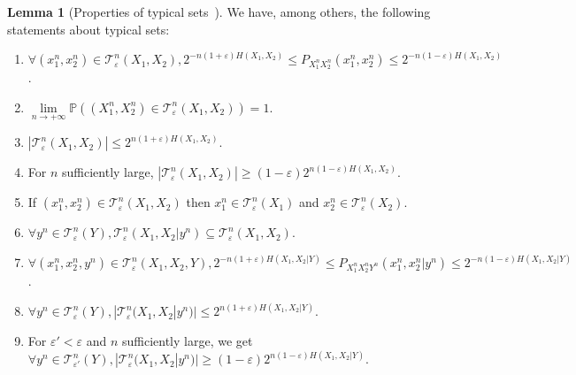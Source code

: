 \documentclass[11pt]{article}
\theoremstyle{definition}
\newtheorem{lem}[theo]{Lemma}
\theoremstyle{remark}
\begin{document}
      \begin{lem}[Properties of typical sets~\cite{GK11}]
        We have, among others, the following statements about typical sets:
        \begin{enumerate}
        \item $\forall (x_1^n,x_2^n) \in \mathcal{T}^n_{\varepsilon}(X_1,X_2), 2^{-n(1+\varepsilon)H(X_1,X_2)} \leq P_{X_1^nX_2^n}(x_1^n,x_2^n) \leq 2^{-n(1-\varepsilon)H(X_1,X_2)}$.
        \item $\underset{n \rightarrow +\infty}{\lim} \mathbb{P}\left((X_1^n,X_2^n) \in \mathcal{T}^n_{\varepsilon}(X_1,X_2) \right) = 1$.
        \item $|\mathcal{T}^n_{\varepsilon}(X_1,X_2)| \leq 2^{n(1+\varepsilon)H(X_1,X_2)}$.
        \item For $n$ sufficiently large, $|\mathcal{T}^n_{\varepsilon}(X_1,X_2)| \geq (1-\varepsilon)2^{n(1-\varepsilon)H(X_1,X_2)}$.
        \item If $(x_1^n,x_2^n) \in \mathcal{T}^n_{\varepsilon}(X_1,X_2)$ then $x_1^n \in \mathcal{T}^n_{\varepsilon}(X_1)$ and $x_2^n \in \mathcal{T}^n_{\varepsilon}(X_2)$.
        \item $\forall y^n \in \mathcal{T}^n_{\varepsilon}(Y), \mathcal{T}^n_{\varepsilon}(X_1,X_2|y^n) \subseteq \mathcal{T}^n_{\varepsilon}(X_1,X_2)$.
        \item $\forall (x_1^n,x_2^n,y^n) \in \mathcal{T}^n_{\varepsilon}(X_1,X_2,Y), 2^{-n(1+\varepsilon)H(X_1,X_2|Y)} \leq P_{X_1^nX_2^nY^n}(x_1^n,x_2^n|y^n) \leq 2^{-n(1-\varepsilon)H(X_1,X_2|Y)}$.
        \item $\forall y^n \in \mathcal{T}^n_{\varepsilon}(Y), |\mathcal{T}^n_{\varepsilon}(X_1,X_2|y^n)| \leq 2^{n(1+\varepsilon)H(X_1,X_2|Y)}$.
        \item For $\varepsilon' < \varepsilon$ and $n$ sufficiently large, we get $\forall y^n \in \mathcal{T}^n_{\varepsilon'}(Y), |\mathcal{T}^n_{\varepsilon}(X_1,X_2|y^n)| \geq (1-\varepsilon)2^{n(1-\varepsilon)H(X_1,X_2|Y)}$.
        \end{enumerate}
      \end{lem}
\end{document}
